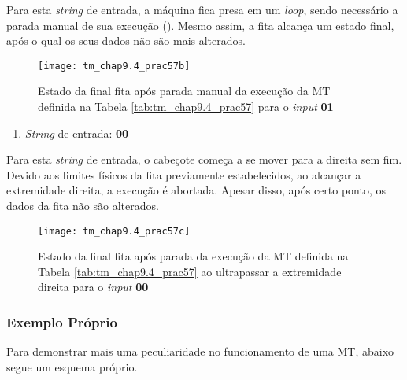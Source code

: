 Para esta \textit{string} de entrada, a máquina fica presa em um \textit{loop},
sendo necessário a parada manual de sua execução (). Mesmo assim,
a fita alcança um estado final, após o qual os seus dados não são mais
alterados.

\begin{figure}[H]
    \centering
    \texttt{[image: tm\_chap9.4\_prac57b]}
    \caption{
        Estado da final fita após parada manual da execução da MT definida na
        Tabela \ref{tab:tm_chap9.4_prac57} para o \textit{input} \textbf{01}
    }
    \label{fig:tm_chap9.4_prac57b}
\end{figure}

\begin{enumerate}[resume*]
    \item \textit{String} de entrada: \textbf{00}
\end{enumerate}

Para esta \textit{string} de entrada, o cabeçote começa a se mover para a
direita sem fim. Devido aos limites físicos da fita previamente estabelecidos,
ao alcançar a extremidade direita, a execução é abortada. Apesar disso, após
certo ponto, os dados da fita não são alterados.

\begin{figure}[H]
    \centering
    \texttt{[image: tm\_chap9.4\_prac57c]}
    \caption{
        Estado da final fita após parada da execução da MT definida na
        Tabela \ref{tab:tm_chap9.4_prac57} ao ultrapassar a extremidade direita
        para o \textit{input} \textbf{00}
    }
    \label{fig:tm_chap9.4_prac57c}
\end{figure}

\subsubsection*{Exemplo Próprio}

Para demonstrar mais uma peculiaridade no funcionamento de uma MT, abaixo segue
um esquema próprio.

